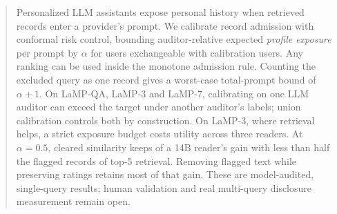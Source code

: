 \begin{abstract}
Personalized LLM assistants expose personal history when retrieved records
enter a provider's prompt. We calibrate record admission with conformal risk
control, bounding auditor-relative expected \emph{profile exposure} per prompt
by $\alpha$ for users exchangeable with calibration users. Any ranking can be
used inside the monotone admission rule. Counting the excluded query as one
record gives a worst-case total-prompt bound of $\alpha+1$.
On LaMP-QA, LaMP-3 and LaMP-7, calibrating on one LLM auditor can exceed the
target under another auditor's labels; union calibration controls both by
construction. On LaMP-3, where retrieval helps, a strict exposure budget
costs utility across three readers. At $\alpha=0.5$, cleared similarity keeps
\FourteenCSimKeptD{} of a 14B reader's gain with less than half the flagged
records of top-5 retrieval. Removing flagged text while preserving ratings
retains most of that gain. These are model-audited, single-query results;
human validation and real multi-query disclosure measurement remain open.
\end{abstract}
